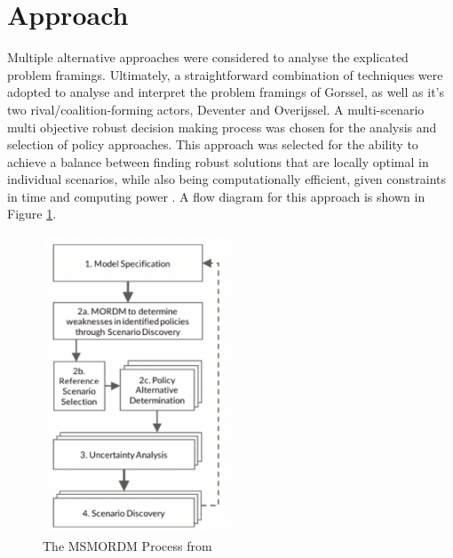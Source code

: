 \section{Approach}
\label{s:approach}


Multiple alternative approaches were considered to analyse the explicated problem framings. Ultimately, a straightforward combination of techniques were adopted to analyse and interpret the problem framings of Gorssel, as well as it's two rival/coalition-forming actors, Deventer and Overijssel. A multi-scenario multi objective robust decision making process was chosen for the analysis and selection of policy approaches. This approach was selected for the ability to achieve a balance between finding robust solutions that are locally optimal in individual scenarios, while also being computationally efficient, given constraints in time and computing power \parencite{bartholomew_considering_2020}. A flow diagram for this approach is shown in Figure \ref{fig:msmordm}.

\begin{figure}[h]
    \centering
    \includegraphics[width=0.5\textwidth]{report/figures/msmordm.png}
    \caption{The MSMORDM Process from \citeauthor{bartholomew_considering_2020}}
    \label{fig:msmordm}
\end{figure}

